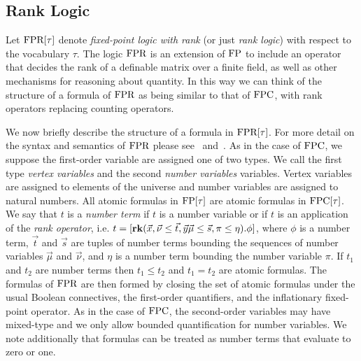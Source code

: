 \documentclass[../paper.tex]{subfiles}
\begin{document}

\subsection{Rank Logic}
Let $\text{\upshape FPR}[\tau]$ denote \emph{fixed-point logic with rank} (or just \emph{rank
  logic}) with respect to the vocabulary $\tau$. The logic $\text{\upshape FPR}$ is an
extension of $\text{\upshape FP}$ to include an operator that decides the rank of a definable
matrix over a finite field, as well as other mechanisms for reasoning about
quantity. In this way we can think of the structure of a formula of $\text{\upshape FPR}$ as
being similar to that of $\text{\upshape FPC}$, with rank operators replacing counting
operators.

We now briefly describe the structure of a formula in $\text{\upshape FPR}[\tau]$. For more
detail on the syntax and semantics of $\text{\upshape FPR}$ please see~\cite{GradelP15a}
and~\cite{Dawar09logicswith}. As in the case of $\text{\upshape FPC}$, we suppose the
first-order variable are assigned one of two types. We call the first type
\emph{vertex variables} and the second \emph{number variables} variables. Vertex
variables are assigned to elements of the universe and number variables are
assigned to natural numbers. All atomic formulas in $\text{\upshape FP}[\tau]$ are atomic
formulas in $\text{\upshape FPC}[\tau]$. We say that $t$ is a \emph{number term} if $t$ is a
number variable or if $t$ is an application of the \emph{rank operator}, i.e. $t
= [\text{\textbf{rk}} (\vec{x}, \vec {\nu} \leq \vec{t}, \vec{y}\vec{\mu} \leq \vec{s}, \pi
\leq \eta). \phi]$, where $\phi$ is a number term, $\vec{t}$ and $\vec{s}$ are
tuples of number terms bounding the sequences of number variables $\vec{\mu}$
and $\vec{\nu}$, and $\eta$ is a number term bounding the number variable $\pi$.
If $t_1$ and $t_2$ are number terms then $t_1 \leq t_2$ and $t_1 = t_2$ are
atomic formulas. The formulas of $\text{\upshape FPR}$ are then formed by closing the set of
atomic formulas under the usual Boolean connectives, the first-order
quantifiers, and the inflationary fixed-point operator. As in the case of
$\text{\upshape FPC}$, the second-order variables may have mixed-type and we only allow bounded
quantification for number variables. We note additionally that formulas can be
treated as number terms that evaluate to zero or one.
\end{document}
